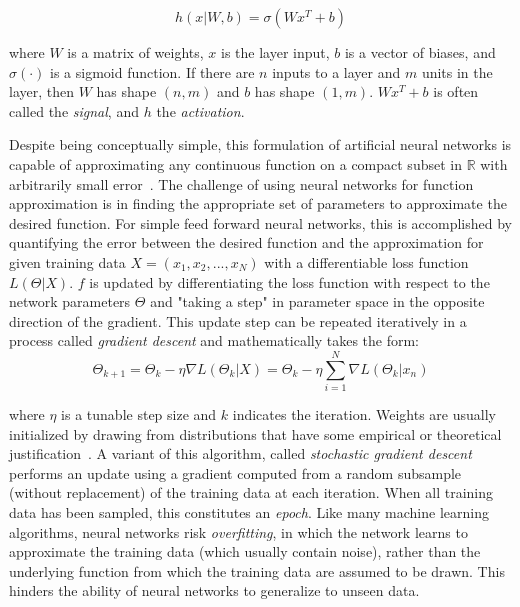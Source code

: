 \begin{equation}
h(x|W, b)=\sigma(W x^T + b)
\label{eq:denselayer}
\end{equation}

\noindent
where $W$ is a matrix of weights, $x$ is the layer input, $b$ is a vector of biases, and $\sigma(\cdot)$ is a sigmoid function.
If there are $n$ inputs to a layer and $m$ units in the layer, then $W$ has shape $(n,m)$ and $b$ has shape $(1,m)$.
$W x^T + b$ is often called the \textit{signal}, and $h$ the \textit{activation}.

Despite being conceptually simple, this formulation of artificial neural networks is capable of approximating any continuous function on a compact subset in $\mathbb{R}$ with arbitrarily small error~\cite{cybenko1989}.
The challenge of using neural networks for function approximation is in finding the appropriate set of parameters to approximate the desired function.
For simple feed forward neural networks, this is accomplished by quantifying the error between the desired function and the approximation for given training data $X=(x_1, x_2, ..., x_N)$ with a differentiable loss function $L(\Theta | X)$. 
$f$ is updated by differentiating the loss function with respect to the network parameters $\Theta$ and "taking a step" in parameter space in the opposite direction of the gradient. 
This update step can be repeated iteratively in a process called \textit{gradient descent} and mathematically takes the form:
\begin{equation}
\Theta_{k+1} = \Theta_k - \eta \nabla L(\Theta_k | X) = \Theta_k - \eta \sum_{i=1}^{N} \nabla L(\Theta_k | x_n)
\label{eq:bgd}
\end{equation}

\noindent
where $\eta$ is a tunable step size and $k$ indicates the iteration.
Weights are usually initialized by drawing from distributions that have some empirical or theoretical justification~\cite{glorot2010}.
A variant of this algorithm, called \textit{stochastic gradient descent} performs an update using a gradient computed from a random subsample (without replacement) of the training data at each iteration.
When all training data has been sampled, this constitutes an \textit{epoch}.
Like many machine learning algorithms, neural networks risk \textit{overfitting}, in which the network learns to approximate the training data (which usually contain noise), rather than the underlying function from which the training data are assumed to be drawn.
This hinders the ability of neural networks to generalize to unseen data.

